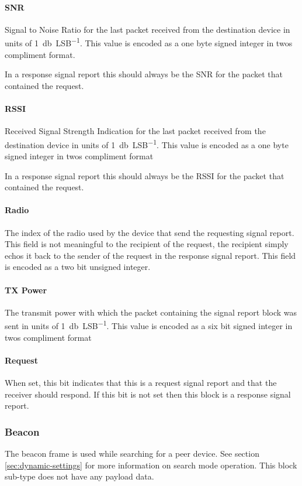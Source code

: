 \paragraph{SNR}
Signal to Noise Ratio for the last packet received from the destination device in units of \SI{1}{\decibel\per LSB}.
This value is encoded as a one byte signed integer in twos compliment format.

In a response signal report this should always be the SNR for the packet that contained the request.

\paragraph{RSSI}
Received Signal Strength Indication for the last packet received from the destination device in units of
\SI{1}{\decibel\per LSB}. This value is encoded as a one byte signed integer in twos compliment format

In a response signal report this should always be the RSSI for the packet that contained the request.

\paragraph{Radio}
The index of the radio used by the device that send the requesting signal report. This field is not meaningful to the
recipient of the request, the recipient simply echos it back to the sender of the request in the response signal
report. This field is encoded as a two bit unsigned integer.

\paragraph{TX Power}
The transmit power with which the packet containing the signal report block was sent in units of \SI{1}{\decibel\per
    LSB}. This value is encoded as a six bit signed integer in twos compliment format

\paragraph{Request}
When set, this bit indicates that this is a request signal report and that the receiver should respond. If this bit is
not set then this block is a response signal report.

\subsubsection{Beacon}
The beacon frame is used while searching for a peer device. See section \ref{sec:dynamic-settings} for more information
on search mode operation. This block sub-type does not have any payload data.

